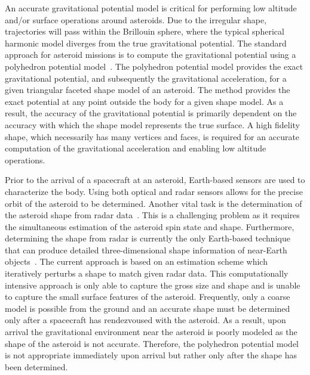 \documentclass[letterpaper, paper,11pt]{AAS}		%
\begin{document}
An accurate gravitational potential model is critical for performing low altitude and/or surface operations around asteroids.
Due to the irregular shape, trajectories will pass within the Brillouin sphere, where the typical spherical harmonic model diverges from the true gravitational potential.
The standard approach for asteroid missions is to compute the gravitational potential using a polyhedron potential model~\cite{werner1996}.
The polyhedron potential model provides the exact gravitational potential, and subsequently the gravitational acceleration, for a given triangular faceted shape model of an asteroid.
The method provides the exact potential at any point outside the body for a given shape model.
As a result, the accuracy of the gravitational potential is primarily dependent on the accuracy with which the shape model represents the true surface.
A high fidelity shape, which necessarily has many vertices and faces, is required for an accurate computation of the gravitational acceleration and enabling low altitude operations.

Prior to the arrival of a spacecraft at an asteroid, Earth-based sensors are used to characterize the body.
Using both optical and radar sensors allows for the precise orbit of the asteroid to be determined.
Another vital task is the determination of the asteroid shape from radar data~\cite{hudson1994,busch2011}.
This is a challenging problem as it requires the simultaneous estimation of the asteroid spin state and shape.
Furthermore, determining the shape from radar is currently the only Earth-based technique that can produce detailed three-dimensional shape information of near-Earth objects~\cite{greenberg2015}.
The current approach is based on an estimation scheme which iteratively perturbs a shape to match given radar data.
This computationally intensive approach is only able to capture the gross size and shape and is unable to capture the small surface features of the asteroid.
Frequently, only a coarse model is possible from the ground and an accurate shape must be determined only after a spacecraft has rendezvoused with the asteroid.
As a result, upon arrival the gravitational environment near the asteroid is poorly modeled as the shape of the asteroid is not accurate.
Therefore, the polyhedron potential model is not appropriate immediately upon arrival but rather only after the shape has been determined.
\end{document}
